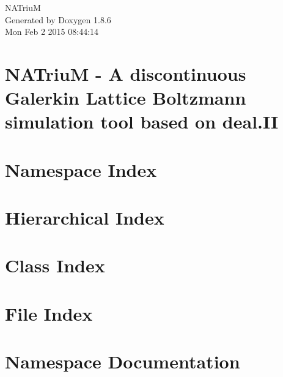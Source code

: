 \documentclass[twoside]{book}
\newcommand{\clearemptydoublepage}{%
  \newpage{\pagestyle{empty}\cleardoublepage}%
}
\begin{document}
\hypersetup{pageanchor=false}
\begin{titlepage}
\vspace*{7cm}
\begin{center}%
{\Large N\-A\-Triu\-M }\\
\vspace*{1cm}
{\large Generated by Doxygen 1.8.6}\\
\vspace*{0.5cm}
{\small Mon Feb 2 2015 08:44:14}\\
\end{center}
\end{titlepage}
\clearemptydoublepage
\tableofcontents
\clearemptydoublepage
{}
\hypersetup{pageanchor=true}

\chapter{N\-A\-Triu\-M -\/ A discontinuous Galerkin Lattice Boltzmann simulation tool based on deal.\-I\-I}
\label{index}\hypertarget{index}{}
\chapter{Namespace Index}

\chapter{Hierarchical Index}

\chapter{Class Index}

\chapter{File Index}

\chapter{Namespace Documentation}

\end{document}
